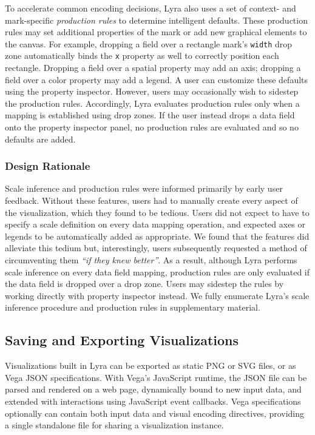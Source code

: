 To accelerate common encoding decisions, Lyra also uses a set of context- and
mark-specific \emph{production rules} to determine intelligent defaults. These
production rules may set additional properties of the mark or add new graphical
elements to the canvas. For example, dropping a field over a rectangle mark's
\texttt{width} drop zone automatically binds the \texttt{x} property as well to
correctly position each rectangle. Dropping a field over a spatial property may
add an axis; dropping a field over a color property may add a legend. A user can
customize these defaults using the property inspector. However, users may
occasionally wish to sidestep the production rules. Accordingly, Lyra evaluates
production rules only when a mapping is established using drop zones. If the
user instead drops a data field onto the property inspector panel, no production
rules are evaluated and so no defaults are added.

\subsubsection{Design Rationale}

Scale inference and production rules were informed primarily by early user
feedback. Without these features, users had to manually create every aspect of
the visualization, which they found to be tedious. Users did not expect to have
to specify a scale definition on every data mapping operation, and expected axes
or legends to be automatically added as appropriate. We found that the features
did alleviate this tedium but, interestingly, users subsequently requested a
method of circumventing them \emph{``if they knew better''}. As a result,
although Lyra performs scale inference on every data field mapping, production
rules are only evaluated if the data field is dropped over a drop zone. Users
may sidestep the rules by working directly with property inspector instead. We
fully enumerate Lyra's scale inference procedure and production rules in
supplementary material.

\subsection{Saving and Exporting Visualizations}

Visualizations built in Lyra can be exported as static PNG or SVG files, or as
Vega JSON specifications. With Vega's JavaScript runtime, the JSON file can be
parsed and rendered on a web page, dynamically bound to new input data, and
extended with interactions using JavaScript event callbacks. Vega specifications
optionally can contain both input data and visual encoding directives, providing
a single standalone file for sharing a visualization instance.